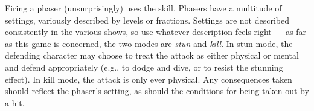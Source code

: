 \documentclass[12pt,titlepage,openany]{book}
\begin{document}
Firing a phaser (unsurprisingly) uses the  skill. Phasers have a
multitude of settings, variously described by levels or fractions. Settings are
not described consistently in the various \StarTrek{} shows, so use whatever
description feels right --- as far as this game is concerned, the two modes are
\emph{stun} and \emph{kill}. In stun mode, the defending character may choose
to treat the attack as either physical or mental and defend appropriately
(e.g.,  to dodge and dive, or  to resist the
stunning effect). In kill mode, the attack is only ever physical. Any
consequences taken should reflect the phaser's setting, as should the
conditions for being taken out by a hit.
\end{document}
